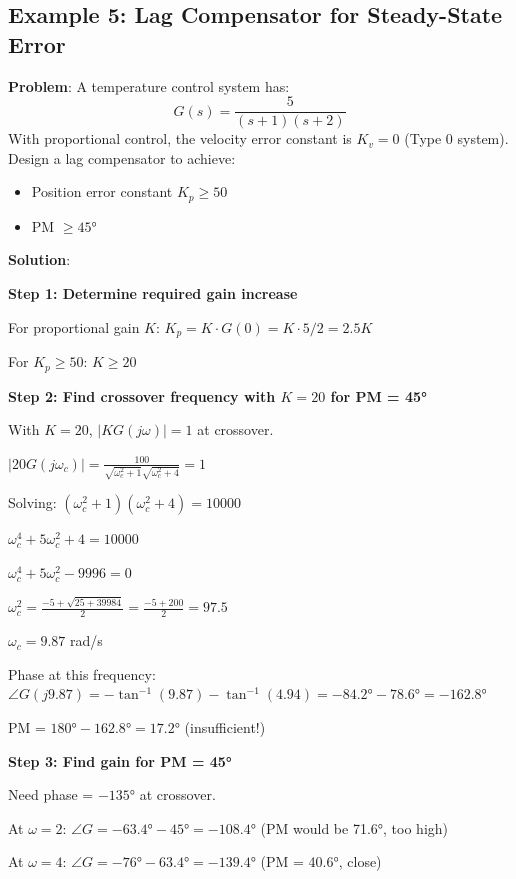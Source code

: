 \subsection{Example 5: Lag Compensator for Steady-State Error}
\label{subsec:ex_lag_ss_error}

\textbf{Problem}: A temperature control system has:
\begin{equation}
G(s) = \frac{5}{(s + 1)(s + 2)}
\end{equation}
With proportional control, the velocity error constant is $K_v = 0$ (Type 0 system). Design a lag compensator to achieve:
\begin{itemize}
    \item Position error constant $K_p \geq 50$
    \item PM $\geq 45°$
\end{itemize}

\textbf{Solution}:

\textbf{Step 1: Determine required gain increase}

For proportional gain $K$: $K_p = K \cdot G(0) = K \cdot 5/2 = 2.5K$

For $K_p \geq 50$: $K \geq 20$

\textbf{Step 2: Find crossover frequency with $K = 20$ for PM = 45°}

With $K = 20$, $|KG(j\omega)| = 1$ at crossover.

$|20G(j\omega_c)| = \frac{100}{\sqrt{\omega_c^2+1}\sqrt{\omega_c^2+4}} = 1$

Solving: $(\omega_c^2+1)(\omega_c^2+4) = 10000$

$\omega_c^4 + 5\omega_c^2 + 4 = 10000$

$\omega_c^4 + 5\omega_c^2 - 9996 = 0$

$\omega_c^2 = \frac{-5 + \sqrt{25 + 39984}}{2} = \frac{-5 + 200}{2} = 97.5$

$\omega_c = 9.87$ rad/s

Phase at this frequency:
$\angle G(j9.87) = -\tan^{-1}(9.87) - \tan^{-1}(4.94) = -84.2° - 78.6° = -162.8°$

PM = $180° - 162.8° = 17.2°$ (insufficient!)

\textbf{Step 3: Find gain for PM = 45°}

Need phase = $-135°$ at crossover.

At $\omega = 2$: $\angle G = -63.4° - 45° = -108.4°$ (PM would be 71.6°, too high)

At $\omega = 4$: $\angle G = -76° - 63.4° = -139.4°$ (PM = 40.6°, close)

